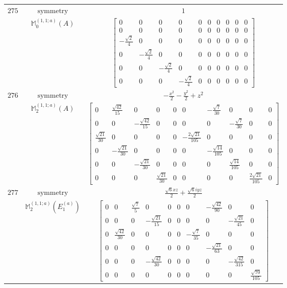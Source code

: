 \documentclass[fleqn,8pt,landscape]{jsarticle}
\begin{document}
\begin{longtable}{ccc}
$ 275 $ & $ \text{symmetry} $ & $ 1 $ \\
$  $ & $ \mathbb{M}_{0}^{(1,1;a)}(A) $ & $ \begin{bmatrix} 0 & 0 & 0 & 0 & 0 & 0 & 0 & 0 & 0 & 0 \\ 0 & 0 & 0 & 0 & 0 & 0 & 0 & 0 & 0 & 0 \\ - \frac{\sqrt{2}}{4} & 0 & 0 & 0 & 0 & 0 & 0 & 0 & 0 & 0 \\ 0 & - \frac{\sqrt{2}}{4} & 0 & 0 & 0 & 0 & 0 & 0 & 0 & 0 \\ 0 & 0 & - \frac{\sqrt{2}}{4} & 0 & 0 & 0 & 0 & 0 & 0 & 0 \\ 0 & 0 & 0 & - \frac{\sqrt{2}}{4} & 0 & 0 & 0 & 0 & 0 & 0 \end{bmatrix} $ \\ \hline
$ 276 $ & $ \text{symmetry} $ & $ - \frac{x^{2}}{2} - \frac{y^{2}}{2} + z^{2} $ \\
$  $ & $ \mathbb{M}_{2}^{(1,1;a)}(A) $ & $ \begin{bmatrix} 0 & \frac{\sqrt{42}}{15} & 0 & 0 & 0 & 0 & - \frac{\sqrt{7}}{30} & 0 & 0 & 0 \\ 0 & 0 & - \frac{\sqrt{42}}{15} & 0 & 0 & 0 & 0 & - \frac{\sqrt{7}}{30} & 0 & 0 \\ \frac{\sqrt{21}}{30} & 0 & 0 & 0 & 0 & - \frac{2 \sqrt{21}}{105} & 0 & 0 & 0 & 0 \\ 0 & - \frac{\sqrt{21}}{30} & 0 & 0 & 0 & 0 & - \frac{\sqrt{14}}{105} & 0 & 0 & 0 \\ 0 & 0 & - \frac{\sqrt{21}}{30} & 0 & 0 & 0 & 0 & \frac{\sqrt{14}}{105} & 0 & 0 \\ 0 & 0 & 0 & \frac{\sqrt{21}}{30} & 0 & 0 & 0 & 0 & \frac{2 \sqrt{21}}{105} & 0 \end{bmatrix} $ \\ \hline
$ 277 $ & $ \text{symmetry} $ & $ \frac{\sqrt{6} x z}{2} + \frac{\sqrt{6} i y z}{2} $ \\
$  $ & $ \mathbb{M}_{2}^{(1,1;a)}(E_{1}^{(a)}) $ & $ \begin{bmatrix} 0 & 0 & \frac{\sqrt{7}}{5} & 0 & 0 & 0 & 0 & - \frac{\sqrt{42}}{90} & 0 & 0 \\ 0 & 0 & 0 & - \frac{\sqrt{21}}{15} & 0 & 0 & 0 & 0 & - \frac{\sqrt{21}}{45} & 0 \\ 0 & \frac{\sqrt{42}}{30} & 0 & 0 & 0 & 0 & - \frac{\sqrt{7}}{35} & 0 & 0 & 0 \\ 0 & 0 & 0 & 0 & 0 & 0 & 0 & - \frac{\sqrt{21}}{63} & 0 & 0 \\ 0 & 0 & 0 & - \frac{\sqrt{42}}{30} & 0 & 0 & 0 & 0 & - \frac{\sqrt{42}}{315} & 0 \\ 0 & 0 & 0 & 0 & 0 & 0 & 0 & 0 & 0 & \frac{\sqrt{70}}{105} \end{bmatrix} $ \\ \hline

\end{longtable}
\end{document}
